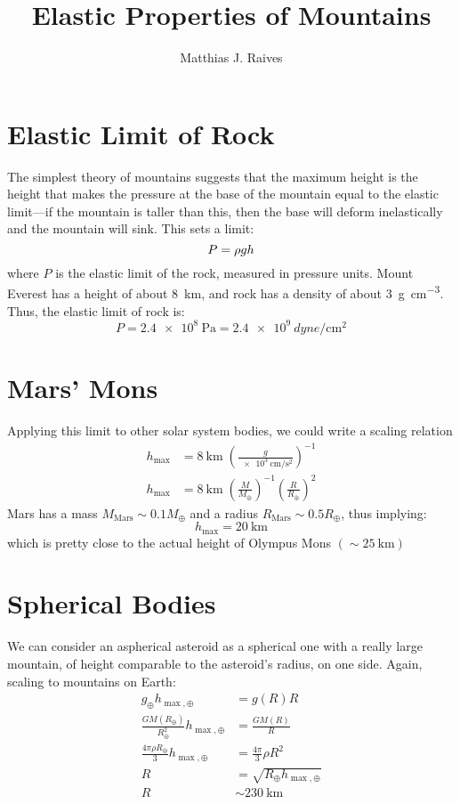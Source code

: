 \documentclass{article}
\title{Elastic Properties of Mountains}
\author{Matthias J. Raives}
\begin{document}
  
  \maketitle{}
  
  \section{Elastic Limit of Rock}
  The simplest theory of mountains suggests that the maximum height is the height that makes the pressure at the base of the mountain equal to the elastic limit---if the mountain is taller than this, then the base will deform inelastically and the mountain will sink.  This sets a limit:
  \begin{equation}
    P =\rho g h\\
  \end{equation}
  where $P$ is the elastic limit of the rock, measured in pressure units.  Mount Everest has a height of about \SI{8}{\km}, and rock has a density of about \SI{3}{\gram\per\cm\cubed}.  Thus, the elastic limit of rock is:
  \begin{equation}
    P = \SI{2.4e8}{\Pa} = \SI{2.4e9}{dyne\per\cm\squared}
  \end{equation}
  \section{Mars' Mons}
  Applying this limit to other solar system bodies, we could write a scaling relation
  \begin{align}
    h_{\max} &= \SI{8}{\km}\;\left(\frac{g}{\SI{e3}{\cm\per\second\squared}}\right)^{-1}\\
    h_{\max} &= \SI{8}{\km}\;\left(\frac{M}{M_{\oplus}}\right)^{-1}\left(\frac{R}{R_{\oplus}}\right)^{2}
  \end{align}
  Mars has a mass $M_{\mathrm{Mars}}\sim0.1{M_{\oplus}}$ and a radius $R_{\mathrm{Mars}}\sim0.5R_{\oplus}$, thus implying:
  \begin{equation}
    h_{\max} = \SI{20}{\km}
  \end{equation}
  which is pretty close to the actual height of Olympus Mons $(\sim\SI{25}{\km})$
  \section{Spherical Bodies}
  We can consider an aspherical asteroid as a spherical one with a really large mountain, of height comparable to the asteroid's radius, on one side.  Again, scaling to mountains on Earth:
  \begin{align}
    g_{\oplus}h_{\max,\oplus} &= g(R)R\\
    \frac{GM(R_{\oplus})}{R_{\oplus}^{2}}h_{\max,\oplus} &= \frac{GM(R)}{R}\\
    \frac{4\pi\rho R_{\oplus}}{3}h_{\max,\oplus} &= \frac{4\pi}{3}\rho R^{2}\\
    R &= \sqrt{R_{\oplus}h_{\max,\oplus}}\\
    R &\sim \SI{230}{\km}
  \end{align}
  
\end{document}
